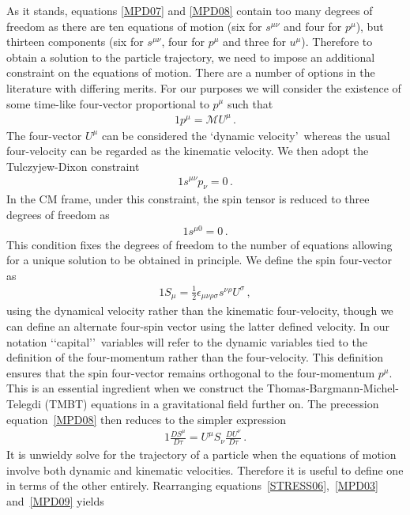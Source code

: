 As it stands, equations \eqref{MPD07} and \eqref{MPD08} contain too many degrees of freedom as there are ten equations of motion (six for $s^{\mu\nu}$ and four for $p^{\mu}$), but thirteen components (six for $s^{\mu\nu}$, four for $p^{\mu}$ and three for $u^{\mu}$). Therefore to obtain a solution to the particle trajectory, we need to impose an additional constraint on the equations of motion. There are a number of options in the literature with differing merits. For our purposes we will consider the existence of some time-like four-vector proportional to $p^{\mu}$ such that
\begin{alignat}{1}
  \label{MPD09} p^{\mu}=\mathcal{M}U^{\mu}\,.
\end{alignat}
The four-vector $U^{\mu}$ can be considered the \lq dynamic velocity\rq\ whereas the usual four-velocity can be regarded as the kinematic velocity. We then adopt the Tulczyjew-Dixon constraint
\begin{alignat}{1}
  \label{MPD10} s^{\mu\nu}p_{\nu}=0\,.
\end{alignat}
In the CM frame, under this constraint, the spin tensor is reduced to three degrees of freedom as
\begin{alignat}{1}
  \label{MPD11} s^{\mu0}=0\,.
\end{alignat}
This condition fixes the degrees of freedom to the number of equations allowing for a unique solution to be obtained in principle. We define the spin four-vector as
\begin{alignat}{1}
  \label{MPD12} S_{\mu}=\frac{1}{2}\epsilon_{\mu\nu\rho\sigma}s^{\nu\rho}U^{\sigma}\,,
\end{alignat}
using the dynamical velocity rather than the kinematic four-velocity, though we can define an alternate four-spin vector using the latter defined velocity. In our notation \lq\lq capital\rq\rq\ variables will refer to the dynamic variables tied to the definition of the four-momentum rather than the four-velocity. This definition ensures that the spin four-vector remains orthogonal to the four-momentum $p^{\mu}$. This is an essential ingredient when we construct the Thomas-Bargmann-Michel-Telegdi (TMBT) equations in a gravitational field further on. The precession equation~\eqref{MPD08} then reduces to the simpler expression
\begin{alignat}{1}
  \label{MPD13} \frac{DS^{\mu}}{D\tau}=U^{\mu}S_{\nu}\frac{DU^{\nu}}{D\tau}\,.
\end{alignat}
It is unwieldy solve for the trajectory of a particle when the equations of motion involve both dynamic and kinematic velocities. Therefore it is useful to define one in terms of the other entirely. Rearranging equations~\eqref{STRESS06},~\eqref{MPD03} and~\eqref{MPD09} yields
